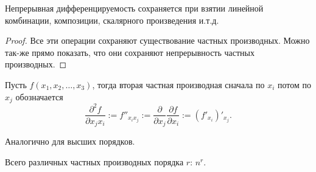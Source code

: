\begin{theorem} \thmslashn

    Непрерывная дифференцируемость сохраняется при взятии линейной комбинации, композиции, скалярного произведения и.т.д.

    \begin{proof} \thmslashn
    
        Все эти операции сохраняют существование частных производных. Можно так-же прямо показать, что они сохраняют непрерывность частных производных.
    \end{proof}
\end{theorem}
\begin{definition} \thmslashn 

    Пусть $f(x_1, x_2, \ldots, x_3)$, тогда вторая частная производная сначала по $x_{i}$ потом по $x_{j}$ обозначается
    \[ \frac{\partial^2 f}{\partial x_{j}x_{i}} := f''_{x_{i}x_{j}} := \frac{\partial}{\partial x_{j}} \frac{\partial f}{\partial x_{i}} := (f'_{x_{i}})'_{x_{j}}    .\]

    Аналогично для высших порядков.
\end{definition}
\begin{remark} \thmslashn

    Всего различных частных производных порядка $r$: $n^{r}$.
\end{remark}
